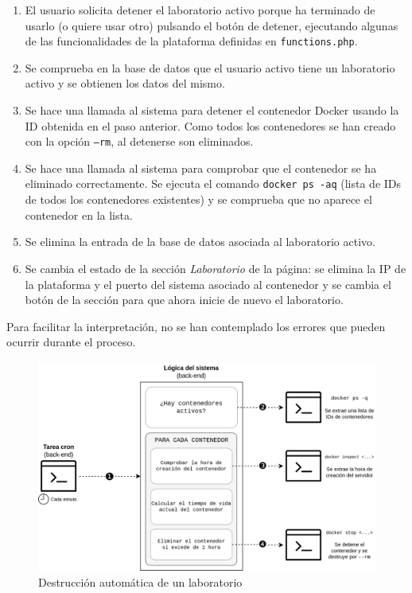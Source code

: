             \begin{enumerate}
                \item El usuario solicita detener el laboratorio activo porque ha terminado de usarlo (o quiere usar otro) pulsando el botón de detener, ejecutando algunas de las funcionalidades de la plataforma definidas en \texttt{functions.php}.

                \item Se comprueba en la base de datos que el usuario activo tiene un laboratorio activo y se obtienen los datos del mismo.

                \item Se hace una llamada al sistema para detener el contenedor Docker usando la ID obtenida en el paso anterior. Como todos los contenedores se han creado con la opción \texttt{--rm}, al detenerse son eliminados.

                \item Se hace una llamada al sistema para comprobar que el contenedor se ha eliminado correctamente. Se ejecuta el comando \texttt{docker ps -aq} (lista de IDs de todos los contenedores existentes) y se comprueba que no aparece el contenedor en la lista.
                
                \item Se elimina la entrada de la base de datos asociada al laboratorio activo.

                \item Se cambia el estado de la sección \textit{Laboratorio} de la página: se elimina la IP de la plataforma y el puerto del sistema asociado al contenedor y se cambia el botón de la sección para que ahora inicie de nuevo el laboratorio.
            \end{enumerate}

            Para facilitar la interpretación, no se han contemplado los errores que pueden ocurrir durante el proceso.

            \newpage

            \begin{figure}
                \centering

                \includegraphics[scale=0.15]{images/Diagramas/detener-cron.png}

                \caption{Destrucción automática de un laboratorio}
                    \label{fig:detener-cron-laboratorio}
            \end{figure}

